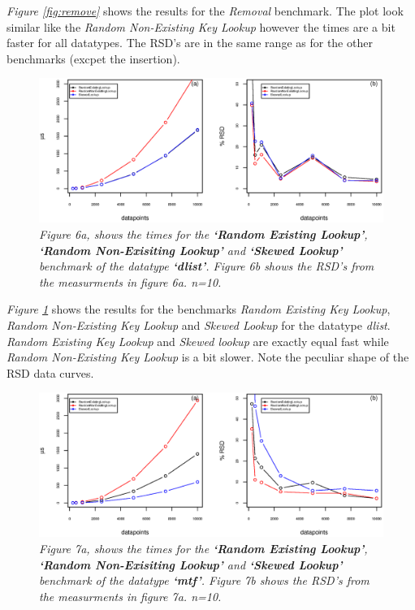 \documentclass[a4paper,11pt,twoside]{article}
\begin{document}
\textit{Figure \ref{fig:remove}} shows the results for the \emph{Removal}
benchmark. The plot look similar like the \emph{Random Non-Existing Key
Lookup} however the times are a bit faster for all datatypes. The
RSD's are in the same range as for the other benchmarks (excpet the
insertion). 

\begin{figure}[H] 
\centering 
\includegraphics[width=\textwidth]{figures/fig6.eps}
\caption{\textit{Figure 6a, shows the times for the \textbf{`Random Existing
    Lookup'}, \textbf{`Random Non-Exisiting Lookup'} and
  \textbf{`Skewed Lookup'} benchmark of the datatype \textbf{`dlist'}. Figure 6b shows the RSD's from the measurments
in figure 6a. n=10.}}
\label{fig:dlist}
\end{figure}

\textit{Figure \ref{fig:dlist}} shows the results for the benchmarks
\emph{Random Existing Key Lookup}, \emph{Random Non-Existing Key Lookup} and
\emph{Skewed Lookup} for the datatype \emph{dlist}. \emph{Random Existing Key Lookup} and
\emph{Skewed lookup} are exactly equal fast while \emph{Random Non-Existing Key
Lookup} is a bit slower. Note the peculiar shape of the RSD data curves.

\begin{figure}[H] 
\centering 
\includegraphics[width=\textwidth]{figures/fig7.eps}
\caption{\textit{Figure 7a, shows the times for the \textbf{`Random Existing
    Lookup'}, \textbf{`Random Non-Exisiting Lookup'} and
  \textbf{`Skewed Lookup'} benchmark of the datatype \textbf{`mtf'}. Figure 7b shows the RSD's from the measurments
in figure 7a. n=10.}}
\label{fig:mtf}
\end{figure}
\end{document}
